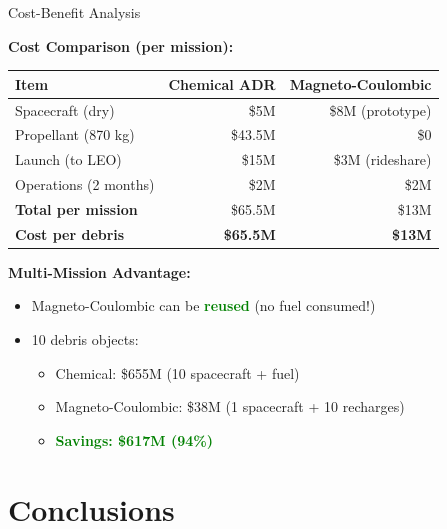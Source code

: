 \documentclass[11pt]{beamer}
\begin{document}
\begin{frame}{Cost-Benefit Analysis}

\textbf{Cost Comparison (per mission):}

\begin{table}[h]
\centering
\begin{tabular}{lrr}
\toprule
\textbf{Item} & \textbf{Chemical ADR} & \textbf{Magneto-Coulombic} \\
\midrule
Spacecraft (dry) & \$5M & \$8M (prototype) \\
Propellant (870 kg) & \$43.5M & \$0 \\
Launch (to LEO) & \$15M & \$3M (rideshare) \\
Operations (2 months) & \$2M & \$2M \\
\midrule
\textbf{Total per mission} & \$65.5M & \$13M \\
\midrule
\textbf{Cost per debris} & \textbf{\$65.5M} & \textbf{\$13M} \\
\bottomrule
\end{tabular}
\end{table}

\vspace{0.2cm}

\textbf{Multi-Mission Advantage:}
\begin{itemize}
\item Magneto-Coulombic can be \textcolor{green}{\textbf{reused}} (no fuel consumed!)
\item 10 debris objects:
\begin{itemize}
\item Chemical: \$655M (10 spacecraft + fuel)
\item Magneto-Coulombic: \$38M (1 spacecraft + 10 recharges)
\item \textcolor{green}{\textbf{Savings: \$617M (94\%)}}
\end{itemize}
\end{itemize}

\end{frame}

\section{Conclusions}
\end{document}
